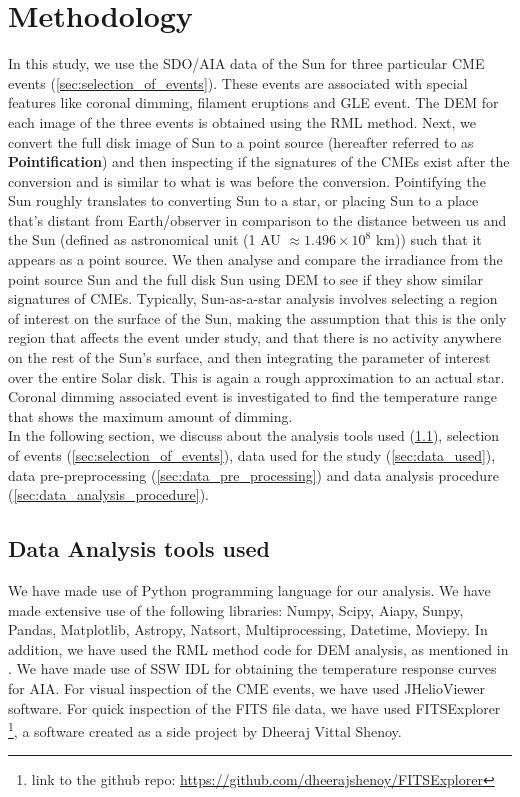 \section{Methodology}

In this study, we use the SDO/AIA data of the Sun for three particular CME events (\cref{sec:selection_of_events}). These events are associated with special features like coronal dimming, filament eruptions and GLE event. The DEM for each image of the three events is obtained using the RML method. Next, we convert the full disk image of Sun to a point source (hereafter referred to as \textbf{Pointification}) and then inspecting if the signatures of the CMEs exist after the conversion and is similar to what is was before the conversion. Pointifying the Sun roughly translates to converting Sun to a star, or placing Sun to a place that's distant from Earth/observer in comparison to the distance between us and the Sun (defined as astronomical unit (1 AU $\approx 1.496\times10^{8}$ km)) such that it appears as a point source. We then analyse and compare the irradiance from the point source Sun and the full disk Sun using DEM to see if they show similar signatures of CMEs. Typically, Sun-as-a-star analysis involves selecting a region of interest on the surface of the Sun, making the assumption that this is the only region that affects the event under study, and that there is no activity anywhere on the rest of the Sun's surface, and then integrating the parameter of interest over the entire Solar disk. This is again a rough approximation to an actual star. Coronal dimming associated event is investigated to find the temperature range that shows the maximum amount of dimming.\\

In the following section, we discuss about the analysis tools used (\cref{sec:data_analysis_tools_used}), selection of events (\cref{sec:selection_of_events}), data used for the study (\cref{sec:data_used}), data pre-preprocessing (\cref{sec:data_pre_processing}) and data analysis procedure (\cref{sec:data_analysis_procedure}).

  \subsection{Data Analysis tools used}
  \label{sec:data_analysis_tools_used}

We have made use of Python programming language for our analysis. We have made extensive use of the following libraries: Numpy, Scipy, Aiapy, Sunpy, Pandas, Matplotlib, Astropy, Natsort, Multiprocessing, Datetime, Moviepy. In addition, we have used the RML method code for DEM analysis, as mentioned in \citep{Massa2023}. We have made use of SSW IDL for obtaining the temperature response curves for AIA. For visual inspection of the CME events, we have used JHelioViewer software. For quick inspection of the FITS file data, we have used FITSExplorer \footnote{link to the github repo: \url{https://github.com/dheerajshenoy/FITSExplorer}}, a software created as a side project by Dheeraj Vittal Shenoy.

